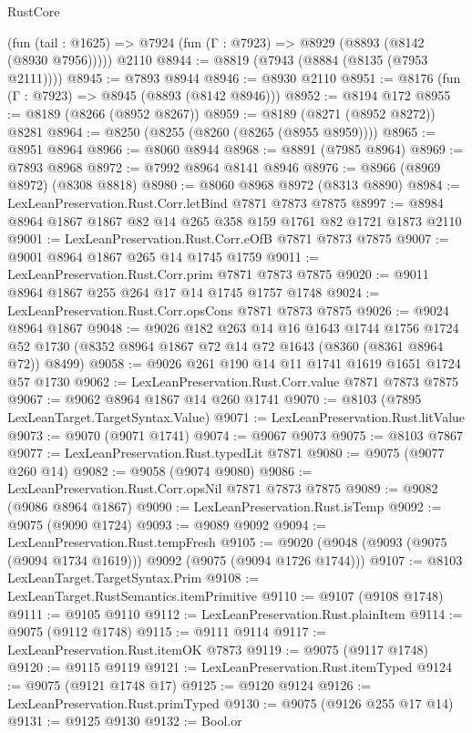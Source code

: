 \begin{lexlean}{RustCore}
\begin{coremodule}
    (fun (tail : @1625) => @7924 (fun (Γ : @7923) => @8929 (@8893 (@8142 (@8930 @7956)))))
    @2110
@8944 := @8819 (@7943 (@8884 (@8135 (@7953 @2111))))
@8945 := @7893 @8944
@8946 := @8930 @2110
@8951 := @8176 (fun (Γ : @7923) => @8945 (@8893 (@8142 @8946)))
@8952 := @8194 @172
@8955 := @8189 (@8266 (@8952 @8267))
@8959 := @8189 (@8271 (@8952 @8272)) @8281
@8964 := @8250 (@8255 (@8260 (@8265 (@8955 @8959))))
@8965 := @8951 @8964
@8966 := @8060 @8944
@8968 := @8891 (@7985 @8964)
@8969 := @7893 @8968
@8972 := @7992 @8964 @8141 @8946
@8976 := @8966 (@8969 @8972) (@8308 @8818)
@8980 := @8060 @8968 @8972 (@8313 @8890)
@8984 := LexLeanPreservation.Rust.Corr.letBind @7871 @7873 @7875
@8997 := @8984 @8964 @1867 @1867 @82 @14 @265 @358 @159 @1761 @82 @1721 @1873 @2110
@9001 := LexLeanPreservation.Rust.Corr.eOfB @7871 @7873 @7875
@9007 := @9001 @8964 @1867 @265 @14 @1745 @1759
@9011 := LexLeanPreservation.Rust.Corr.prim @7871 @7873 @7875
@9020 := @9011 @8964 @1867 @255 @264 @17 @14 @1745 @1757 @1748
@9024 := LexLeanPreservation.Rust.Corr.opsCons @7871 @7873 @7875
@9026 := @9024 @8964 @1867
@9048 := @9026
    @182
    @263
    @14
    @16
    @1643
    @1744
    @1756
    @1724
    @52
    @1730
    (@8352 @8964 @1867 @72 @14 @72 @1643 (@8360 (@8361 @8964 @72)) @8499)
@9058 := @9026 @261 @190 @14 @11 @1741 @1619 @1651 @1724 @57 @1730
@9062 := LexLeanPreservation.Rust.Corr.value @7871 @7873 @7875
@9067 := @9062 @8964 @1867 @14 @260 @1741
@9070 := @8103 (@7895 LexLeanTarget.TargetSyntax.Value)
@9071 := LexLeanPreservation.Rust.litValue
@9073 := @9070 (@9071 @1741)
@9074 := @9067 @9073
@9075 := @8103 @7867
@9077 := LexLeanPreservation.Rust.typedLit @7871
@9080 := @9075 (@9077 @260 @14)
@9082 := @9058 (@9074 @9080)
@9086 := LexLeanPreservation.Rust.Corr.opsNil @7871 @7873 @7875
@9089 := @9082 (@9086 @8964 @1867)
@9090 := LexLeanPreservation.Rust.isTemp
@9092 := @9075 (@9090 @1724)
@9093 := @9089 @9092
@9094 := LexLeanPreservation.Rust.tempFresh
@9105 := @9020 (@9048 (@9093 (@9075 (@9094 @1734 @1619))) @9092 (@9075 (@9094 @1726 @1744)))
@9107 := @8103 LexLeanTarget.TargetSyntax.Prim
@9108 := LexLeanTarget.RustSemantics.itemPrimitive
@9110 := @9107 (@9108 @1748)
@9111 := @9105 @9110
@9112 := LexLeanPreservation.Rust.plainItem
@9114 := @9075 (@9112 @1748)
@9115 := @9111 @9114
@9117 := LexLeanPreservation.Rust.itemOK @7873
@9119 := @9075 (@9117 @1748)
@9120 := @9115 @9119
@9121 := LexLeanPreservation.Rust.itemTyped
@9124 := @9075 (@9121 @1748 @17)
@9125 := @9120 @9124
@9126 := LexLeanPreservation.Rust.primTyped
@9130 := @9075 (@9126 @255 @17 @14)
@9131 := @9125 @9130
@9132 := Bool.or

\end{coremodule}
\end{lexlean}
